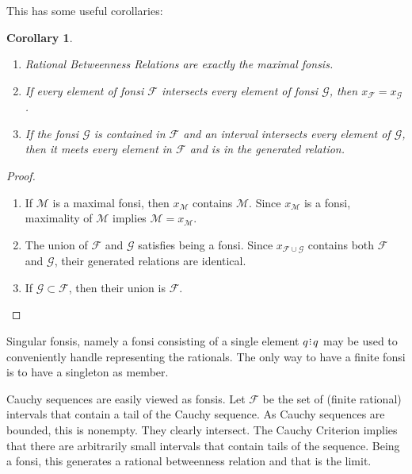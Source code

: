 \documentclass[12pt]{article}
\newtheorem{corollary}{Corollary}[section]
\begin{document}
This has some useful corollaries: 
\begin{corollary}
   \begin{enumerate}[label=\alph*., ref=\thelemma(\alph*) ]
    \item Rational Betweenness Relations are exactly the maximal fonsis. 
    \item If every element of fonsi $\mathcal{F}$ intersects every element of fonsi $\mathcal{G}$, then $x_{\mathcal{F}} = x_{\mathcal{G}}$.
    \item If the fonsi $\mathcal{G}$ is contained in $\mathcal{F}$ and an interval intersects every element of $\mathcal{G}$, then it meets every element in $\mathcal{F}$ and is in the generated relation. 
    \end{enumerate}
\end{corollary}

\begin{proof}
   \begin{enumerate}[label=\alph*.]
    \item If $\mathcal{M}$ is a maximal fonsi, then $x_{\mathcal{M}}$ contains $\mathcal{M}$. Since $x_{\mathcal{M}}$ is a fonsi, maximality of $\mathcal{M}$ implies $\mathcal{M} = x_{\mathcal{M}}$.
    \item The union of $\mathcal{F}$ and $\mathcal{G}$ satisfies being a fonsi. Since $x_{\mathcal{F} \cup \mathcal{G}}$ contains both $\mathcal{F}$ and $\mathcal{G}$, their generated relations are identical. 
    \item If $\mathcal{G} \subset \mathcal{F}$, then their union is $\mathcal{F}$.
    \end{enumerate}
\end{proof}

Singular fonsis, namely a fonsi consisting of a single element $q \rint q$ may be used to conveniently handle representing the rationals. The only way to have a finite fonsi is to have a singleton as member. 

Cauchy sequences are easily viewed as fonsis. Let $\mathcal{F}$ be the set of (finite rational) intervals that contain a tail of the Cauchy sequence. As Cauchy sequences are bounded, this is nonempty. They clearly intersect. The Cauchy Criterion implies that there are arbitrarily small intervals that contain tails of the sequence. Being a fonsi, this generates a rational betweenness relation and that is the limit. 
\end{document}
